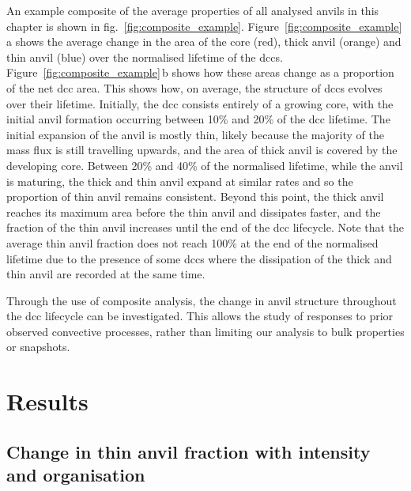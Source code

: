 An example composite of the average properties of all analysed anvils in this chapter is shown in fig.~\ref{fig:composite_example}.
Figure~\ref{fig:composite_example}\,a shows the average change in the area of the core (red), thick anvil (orange) and thin anvil (blue) over the normalised lifetime of the \acrshort{dcc}s.
Figure~\ref{fig:composite_example}\,b shows how these areas change as a proportion of the net \acrshort{dcc} area.
This shows how, on average, the structure of \acrshort{dcc}s evolves over their lifetime.
Initially, the \acrshort{dcc} consists entirely of a growing core, with the initial anvil formation occurring between 10\% and 20\% of the \acrshort{dcc} lifetime.
The initial expansion of the anvil is mostly thin, likely because the majority of the mass flux is still travelling upwards, and the area of thick anvil is covered by the developing core.
Between 20\% and 40\% of the normalised lifetime, while the anvil is maturing, the thick and thin anvil expand at similar rates and so the proportion of thin anvil remains consistent.
Beyond this point, the thick anvil reaches its maximum area before the thin anvil and dissipates faster, and the fraction of the thin anvil increases until the end of the \acrshort{dcc} lifecycle.
Note that the average thin anvil fraction does not reach 100\% at the end of the normalised lifetime due to the presence of some \acrshort{dcc}s where the dissipation of the thick and thin anvil are recorded at the same time.

Through the use of composite analysis, the change in anvil structure throughout the \acrshort{dcc} lifecycle can be investigated. 
This allows the study of responses to prior observed convective processes, rather than limiting our analysis to bulk properties or snapshots.

\section{Results}

\subsection{Change in thin anvil fraction with intensity and organisation}

